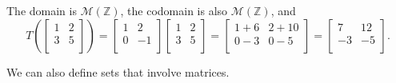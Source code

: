 \begin{exam}
\begin{apart}
            \begin{soln}
                The domain is $\mathscr{M}(\mathbb{Z})$, the codomain is also $\mathscr{M}(\mathbb{Z})$, and $$T\left( \left[ \begin{array}{cc} 1 & 2 \\ 3 & 5 \\ \end{array} \right] \right)
                = \left[ \begin{array}{cr} 1 & 2 \\ 0 & -1 \\ \end{array} \right]
                \left[ \begin{array}{cc} 1 & 2 \\ 3 & 5 \\ \end{array} \right] 
                = \left[ \begin{array}{cc} 1+6 & 2+10 \\ 0-3 & 0-5 \\ \end{array} \right]
                 = \left[ \begin{array}{rr} 7 & 12 \\ -3 & -5 \\ \end{array} \right].$$  
            \end{soln}
    \end{apart}
\end{exam}

We can also define sets that involve matrices.

